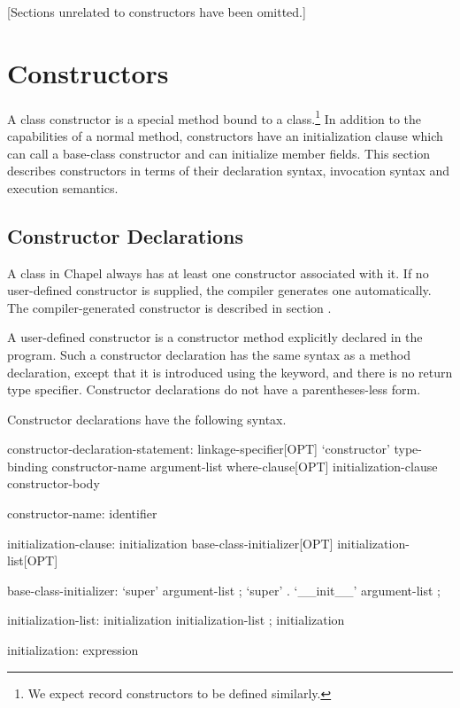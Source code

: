 

\label{Classes}

[Sections unrelated to constructors have been omitted.]

\section{Constructors}
\label{Constructors}

A class constructor is a special method bound to a class.\footnote{We expect
record constructors to be defined similarly.}  In addition to
the capabilities of a normal method, constructors have an initialization clause
which can call a base-class constructor and can initialize member fields.  This
section describes constructors in terms of their declaration syntax, invocation
syntax and execution semantics.  

\subsection{Constructor Declarations}
\label{Constructor_Declarations}

A class in Chapel always has at least one constructor associated with it.  If no
user-defined constructor is supplied, the compiler generates one automatically.
The compiler-generated constructor is described in section .

A user-defined constructor is a constructor method explicitly declared
in the program.  Such a constructor declaration has the same
syntax as a method declaration, except that it is introduced using
the  keyword, and there is no return type specifier.
Constructor declarations do not have a parentheses-less form.

Constructor declarations have the following syntax.
\begin{syntax}
constructor-declaration-statement:
  linkage-specifier[OPT] `constructor' type-binding constructor-name argument-list 
    where-clause[OPT] initialization-clause constructor-body

constructor-name:
  identifier

initialization-clause:
  initialization
  { base-class-initializer[OPT] initialization-list[OPT] }

base-class-initializer:
  `super' argument-list ;
  `super' . `__init__' argument-list ;

initialization-list:
  initialization
  initialization-list ; initialization

initialization:
  expression

\end{syntax}


